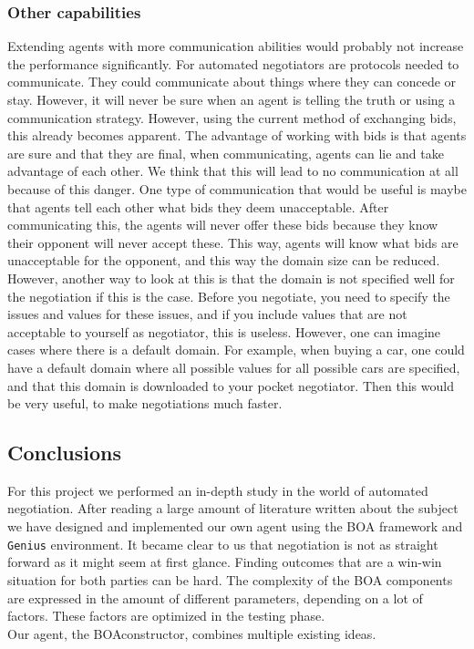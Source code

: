 \subsubsection{Other capabilities}

Extending agents with more communication abilities would probably not increase the performance significantly. For automated negotiators are protocols needed to communicate. They could
communicate about things where they can concede or stay. However, it will never be sure when an agent is telling the truth or using a communication strategy. 
However, using the current method of exchanging bids, this already becomes apparent. The advantage of working with bids is that agents are sure and that they are final,
when communicating, agents can lie and take advantage of each other. We think that this will lead to no communication at all because of this danger.
One type of communication that would be useful is maybe that agents tell each other what bids they deem unacceptable. 
After communicating this, the agents will never offer these bids because they know their opponent will never accept these. This way, 
agents will know what bids are unacceptable for the opponent, and this way the domain size can be reduced. 
However, another way to look at this is that the domain is not specified well for the negotiation if this is the case. Before you negotiate, you need to specify the issues
and values for these issues, and if you include values that are not acceptable to yourself as negotiator, this is useless. However, one can imagine cases where
there is a default domain. For example, when buying a car, one could have a default domain where all possible values for all possible cars are specified, and that this domain is 
downloaded to your pocket negotiator. Then this would be very useful, to make negotiations much faster.

\subsection{Conclusions}

For this project we performed an in-depth study in the world of automated negotiation. After reading a large amount of literature written about the subject we have designed and implemented our own agent using the BOA framework and \texttt{Genius} environment. It became clear to us that negotiation is not as straight forward as it might seem at first glance. Finding outcomes that are a win-win situation for both parties can be hard. The complexity of the BOA components are expressed in the amount of different parameters, depending on a lot of factors. These factors are optimized in the testing phase.  \\

Our agent, the BOAconstructor, combines multiple existing ideas.



